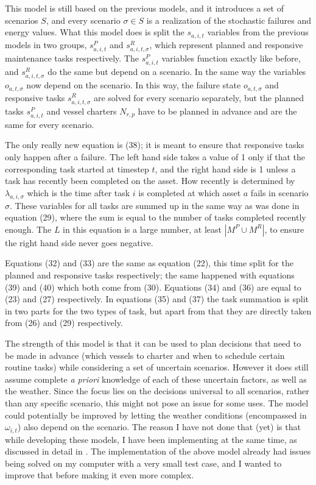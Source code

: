 \documentclass[a4paper,12pt]{article}
\begin{document}
\bigskip

This model is still based on the previous models, and it introduces a set of scenarios $S$, and every scenario $\sigma \in S$ is a realization of the stochastic failures and energy values. What this model does is split the $s_{a,i,t}$ variables from the previous models in two groups, $s^P_{a,i,t}$ and $s^R_{a,i,t,\sigma}$, which represent planned and responsive maintenance tasks respectively. The $s^P_{a,i,t}$ variables function exactly like before, and $s^R_{a,i,t,\sigma}$ do the same but depend on a scenario. In the same way the variables $o_{a,t,\sigma}$ now depend on the scenario. In this way, the failure state $o_{a,t,\sigma}$ and responsive tasks $s^R_{a,i,t,\sigma}$ are solved for every scenario separately, but the planned tasks $s^P_{a,i,t}$ and vessel charters $N_{r,p}$ have to be planned in advance and are the same for every scenario. 

The only really new equation is (38); it is meant to ensure that responsive tasks only happen after a failure. The left hand side takes a value of 1 only if that the corresponding task started at timestep $t$, and the right hand side is 1 unless a task has recently been completed on the asset. How recently is determined by $\lambda_{a,i,\sigma}$ which is the time after task $i$ is completed at which asset $a$ fails in scenario $\sigma$. These variables for all tasks are summed up in the same way as was done in equation (29), where the sum is equal to the number of tasks completed recently enough. The $L$ in this equation is a large number, at least $|M^P \cup M^R|$, to ensure the right hand side never goes negative. 

Equations (32) and (33) are the same as equation (22), this time split for the planned and responsive tasks respectively; the same happened with equations (39) and (40) which both come from (30). Equations (34) and (36) are equal to (23) and (27) respectively. In equations (35) and (37) the task summation is split in two parts for the two types of task, but apart from that they are directly taken from (26) and (29) respectively. 

\bigskip

The strength of this model is that it can be used to plan decisions that need to be made in advance (which vessels to charter and when to schedule certain routine tasks) while considering a set of uncertain scenarios. However it does still assume complete \textit{a priori} knowledge of each of these uncertain factors, as well as the weather. Since the focus lies on the decisions universal to all scenarios, rather than any specific scenario, this might not pose an issue for some uses. The model could potentially be improved by letting the weather conditions (encompassed in $\omega_{i,t}$) also depend on the scenario. The reason I have not done that (yet) is that while developing these models, I have been implementing at the same time, as discussed in detail in . The implementation of the above model already had issues being solved on my computer with a very small test case, and I wanted to improve that before making it even more complex. 
\end{document}
